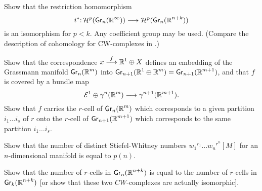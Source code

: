\begin{problem}\label{prob-6-B}
	Show that the restriction homomorphism
	\[\map{i^{*}}{\homology^{p}(\grass{n}{\infty})}{\homology^{p}(\grass{n}{n+k})}
	\]
	is an isomorphism for $p<k $. Any coefficient group may be used. (Compare the description of cohomology for CW-complexes in .)
\end{problem}

\begin{problem}\label{prob-6-C}
	Show that the correspondence $x \stackrel{f}{\longrightarrow} \boldsymbol{\mathbb{R}}^{1} \oplus X$ defines an embedding of the Grassmann manifold $\grass{n}{m}$ into $\grass{n+1}{}(\R^{1} \oplus \R^{m})=\grass{n+1}{m+1}$, and that $f$ is covered by a bundle map
	\[
	\mathcal{E}^{1} \oplus \gamma^{n}(\boldsymbol{\mathbb{R}}^m) \longrightarrow \gamma^{n+1}(\boldsymbol{\mathbb{R}}^{m+1}).
	\]
	Show that $f$ carries the $r$-cell of $\grass{n}{m}$ which corresponds to a given partition $i_{1}\dots i_{s}$ of $r$ onto the $r$-cell of $\grass{n+1}{m+1}$ which corresponds to the same partition $i_{1}\dots i_{s}$.
\end{problem}

\begin{problem}\label{prob-6-D}
	Show that the number of distinct Stiefel-Whitney numbers $w_{1}{ }^{r_{1}}\dots w_{n} { }^{r^{n}}[M]$ for an $n$-dimensional manifold is equal to $p(n)$.
\end{problem}
 
\begin{problem}\label{prob-6-E}
	Show that the number of $r$-cells in $\grass{n}{n+k}$ is equal to the number of $r$-cells in $\grass{k}{n+k}$ [or show that these two $CW$-complexes are actually isomorphic].
\end{problem}


